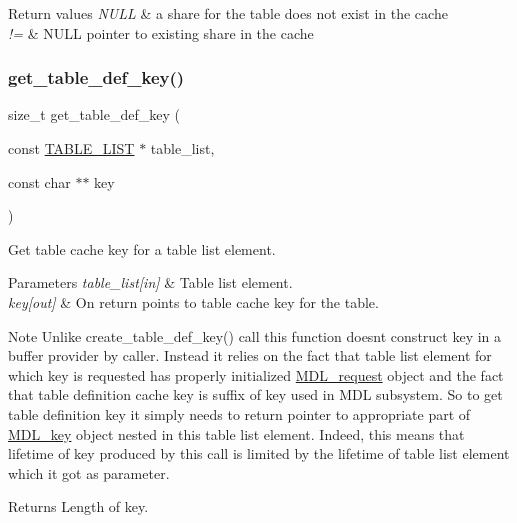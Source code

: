 \begin{DoxyRetVals}{Return values}
{\em N\+U\+LL} & a share for the table does not exist in the cache \\
\hline
{\em !=} & N\+U\+LL pointer to existing share in the cache \\
\hline
\end{DoxyRetVals}
\mbox{\label{group__Data__Dictionary_ga14224b18bb5f7e175fde6932a590defa}} 
\subsubsection{\texorpdfstring{get\+\_\+table\+\_\+def\+\_\+key()}{get\_table\_def\_key()}}
{\footnotesize\ttfamily size\+\_\+t get\+\_\+table\+\_\+def\+\_\+key (\begin{DoxyParamCaption}\item[{const \mbox{\hyperlink{structTABLE__LIST}{T\+A\+B\+L\+E\+\_\+\+L\+I\+ST}} $\ast$}]{table\+\_\+list,  }\item[{const char $\ast$$\ast$}]{key }\end{DoxyParamCaption})}

Get table cache key for a table list element.


\begin{DoxyParams}{Parameters}
{\em table\+\_\+list\mbox{[}in\mbox{]}} & Table list element. \\
\hline
{\em key\mbox{[}out\mbox{]}} & On return points to table cache key for the table.\\
\hline
\end{DoxyParams}
\begin{DoxyNote}{Note}
Unlike create\+\_\+table\+\_\+def\+\_\+key() call this function doesn\textquotesingle{}t construct key in a buffer provider by caller. Instead it relies on the fact that table list element for which key is requested has properly initialized \mbox{\hyperlink{classMDL__request}{M\+D\+L\+\_\+request}} object and the fact that table definition cache key is suffix of key used in M\+DL subsystem. So to get table definition key it simply needs to return pointer to appropriate part of \mbox{\hyperlink{structMDL__key}{M\+D\+L\+\_\+key}} object nested in this table list element. Indeed, this means that lifetime of key produced by this call is limited by the lifetime of table list element which it got as parameter.
\end{DoxyNote}
\begin{DoxyReturn}{Returns}
Length of key. 
\end{DoxyReturn}
\mbox{\label{group__Data__Dictionary_gad9c9e8583421876b16d148a82322e86e}} 
